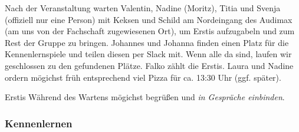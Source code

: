 \documentclass[10pt,twocolumn,ngerman]{scrartcl}
\begin{document}
Nach der Veranstaltung warten Valentin, Nadine (Moritz), Titia und
Svenja (offiziell nur eine Person) mit Keksen und Schild am Nordeingang
des Audimax (am uns von der Fachschaft zugewiesenen Ort), um Erstis
aufzugabeln und zum Rest der Gruppe zu bringen. Johannes und Johanna
finden einen Platz für die Kennenlernspiele und teilen diesen per
Slack mit. Wenn alle da sind, laufen wir geschlossen zu den gefundenen
Plätze. Falko zählt die Erstis. Laura und Nadine ordern mögichst
früh entsprechend viel Pizza für ca. 13:30 Uhr (ggf. später).

Erstis Während des Wartens mögichst begrüßen und \emph{in Gespräche einbinden}.

\subsubsection{Kennenlernen}
\end{document}
